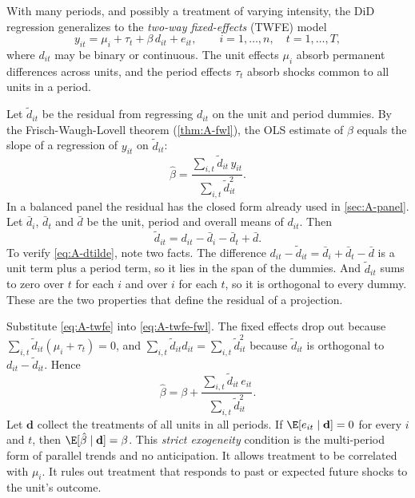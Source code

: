 With many periods, and possibly a treatment of varying intensity, the DiD regression generalizes to the
\emph{two-way fixed-effects} (TWFE) model
\begin{equation}\label{eq:A-twfe}
y_{it}=\mu_i+\tau_t+\beta\,d_{it}+e_{it},\qquad i=1,\dots,n,\quad t=1,\dots,T,
\end{equation}
where $d_{it}$ may be binary or continuous. The unit effects $\mu_i$ absorb permanent differences across units, and
the period effects $\tau_t$ absorb shocks common to all units in a period.

Let $\tilde d_{it}$ be the residual from regressing $d_{it}$ on the unit and period dummies. By the
Frisch-Waugh-Lovell theorem (\cref{thm:A-fwl}), the OLS estimate of $\beta$ equals the slope of a regression of
$y_{it}$ on $\tilde d_{it}$:
\begin{equation}\label{eq:A-twfe-fwl}
\hat\beta=\frac{\sum_{i,t}\tilde d_{it}\,y_{it}}{\sum_{i,t}\tilde d_{it}^2}.
\end{equation}
In a balanced panel the residual has the closed form already used in \cref{sec:A-panel}. Let $\bar d_i$, $\bar d_t$ and $\bar d$ be the unit, period and
overall means of $d_{it}$. Then
\begin{equation}\label{eq:A-dtilde}
\tilde d_{it}=d_{it}-\bar d_i-\bar d_t+\bar d.
\end{equation}
To verify \eqref{eq:A-dtilde}, note two facts. The difference $d_{it}-\tilde d_{it}=\bar d_i+\bar d_t-\bar d$ is a
unit term plus a period term, so it lies in the span of the dummies. And $\tilde d_{it}$ sums to zero over $t$ for
each $i$ and over $i$ for each $t$, so it is orthogonal to every dummy. These are the two properties that define the
residual of a projection.

Substitute \eqref{eq:A-twfe} into \eqref{eq:A-twfe-fwl}. The fixed effects drop out because
$\sum_{i,t}\tilde d_{it}(\mu_i+\tau_t)=0$, and $\sum_{i,t}\tilde d_{it}d_{it}=\sum_{i,t}\tilde d_{it}^2$ because
$\tilde d_{it}$ is orthogonal to $d_{it}-\tilde d_{it}$. Hence
\begin{equation*}
\hat\beta=\beta+\frac{\sum_{i,t}\tilde d_{it}\,e_{it}}{\sum_{i,t}\tilde d_{it}^2}.
\end{equation*}
Let $\mathbf{d}$ collect the treatments of all units in all periods. If $\E[e_{it}\mid\mathbf{d}]=0$ for every $i$
and $t$, then $\E[\hat\beta\mid\mathbf{d}]=\beta$. This \emph{strict exogeneity} condition is the multi-period form of
parallel trends and no anticipation. It allows treatment to be correlated with $\mu_i$. It rules out treatment
that responds to past or expected future shocks to the unit's outcome.

